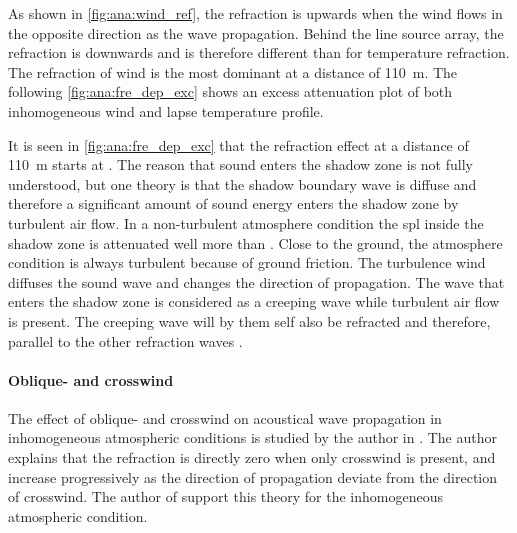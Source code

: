 
As shown in \autoref{fig:ana:wind_ref}, the refraction is upwards when the wind flows in the opposite direction as the wave propagation. Behind the line source array, the refraction is downwards and is therefore different than for temperature refraction. The refraction of wind is the most dominant at a distance of \SI{110}{\meter}. The following \autoref{fig:ana:fre_dep_exc} shows an excess attenuation plot of both inhomogeneous wind and lapse temperature profile. 


It is seen in \autoref{fig:ana:fre_dep_exc} that the refraction effect at a distance of \SI{110}{\meter} starts at . The reason that sound enters the shadow zone is not fully understood, but one theory is that the shadow boundary wave is diffuse and therefore a significant amount of sound energy enters the shadow zone by turbulent air flow. In a non-turbulent atmosphere condition the \gls{spl} inside the shadow zone is attenuated well more than . Close to the ground, the atmosphere condition is always turbulent because of ground friction. The turbulence wind diffuses the sound wave and changes the direction of propagation. The wave that enters the shadow zone is considered as a creeping wave while turbulent air flow is present. The creeping wave will by them self also be refracted and therefore, parallel to the other refraction waves \citep{tur_on_sound}.




\paragraph{Oblique- and crosswind} The effect of oblique- and crosswind on acoustical wave propagation in inhomogeneous atmospheric conditions is studied by the author in \citep{review_of_sound}. The author explains that the refraction is directly zero when only crosswind is present, and increase progressively as the direction of propagation deviate from the direction of crosswind. The author of \citep{no_refraction_1998} support this theory for the inhomogeneous atmospheric condition.

